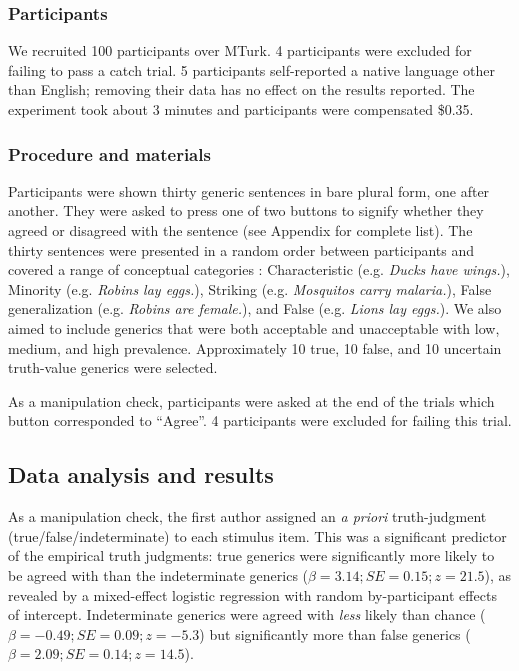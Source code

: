 \documentclass[12pt,letterpaper]{article}
\newcommand{\ndg}[1]{\textcolor{Green}{[ndg: #1]}}
\begin{document}
\subsubsection*{Participants}

We recruited 100 participants over MTurk. 
4 participants were excluded for failing to pass a catch trial.
5 participants self-reported a native language other than English; removing their data has no effect on the results reported. 
The experiment took about 3 minutes and participants were compensated \$0.35.

\subsubsection*{Procedure and materials}

Participants were shown thirty generic sentences in bare plural form, one after another.
They were asked to press one of two buttons to signify whether they agreed or disagreed with the sentence (see Appendix for complete list). 
The thirty sentences were presented in a random order between participants and covered a range of conceptual categories \cite{Prasada2013}: Characteristic (e.g. \emph{Ducks have wings.}), Minority (e.g. \emph{Robins lay eggs.}), Striking (e.g. \emph{Mosquitos carry malaria.}), False generalization (e.g. \emph{Robins are female.}), and False (e.g. \emph{Lions lay eggs.}).
We also aimed to include generics that were both acceptable and unacceptable with low, medium, and high prevalence.
Approximately 10 true, 10 false, and 10 uncertain truth-value generics were selected.

As a manipulation check, participants were asked at the end of the trials which button corresponded to ``Agree''.
4 participants were excluded for failing this trial.

\subsection*{Data analysis and results}
 
 As a manipulation check, the first author assigned an \emph{a priori} truth-judgment (true/false/indeterminate) to each stimulus item.
This was a significant predictor of the empirical truth judgments: true generics were significantly more likely to be agreed with than the indeterminate generics ($\beta = 3.14; SE = 0.15; z = 21.5$), as revealed by a mixed-effect logistic regression with random by-participant effects of intercept.
Indeterminate generics were agreed with \emph{less} likely than chance ($\beta = -0.49; SE = 0.09; z = -5.3$) but significantly more than false generics ($\beta = 2.09; SE = 0.14; z = 14.5$).
\end{document}
